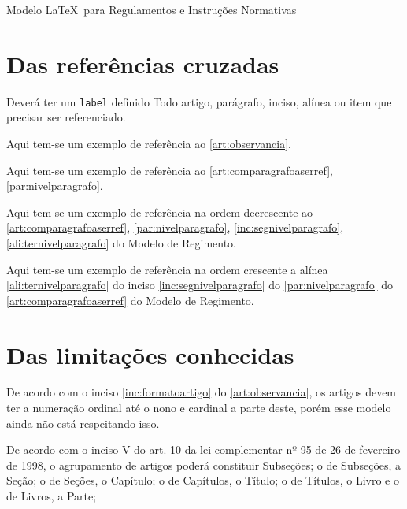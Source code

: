 \documentclass[11pt,twoside,a4paper]{inifsc}
\begin{document}
\begin{normativa}{Modelo \LaTeX~para Regulamentos e Instruções Normativas}
\section{Das referências cruzadas}

\begin{artigo}
    \item Deverá ter um \texttt{label} definido Todo artigo, parágrafo, inciso, alínea ou item que precisar ser referenciado.
    \begin{paragrafo}
        \item Aqui tem-se um exemplo de referência ao \ref{art:observancia}.
        \item Aqui tem-se um exemplo de referência ao \ref{art:comparagrafoaserref}, \ref{par:nivelparagrafo}.
        \item Aqui tem-se um exemplo de referência na ordem decrescente ao \ref{art:comparagrafoaserref}, \ref{par:nivelparagrafo}, \ref{inc:segnivelparagrafo}, \ref{ali:ternivelparagrafo} do Modelo de Regimento.
        \item Aqui tem-se um exemplo de referência na ordem crescente a alínea \ref{ali:ternivelparagrafo} do inciso \ref{inc:segnivelparagrafo} do \ref{par:nivelparagrafo} do \ref{art:comparagrafoaserref} do Modelo de Regimento.
    \end{paragrafo}
\end{artigo}


\section{Das limitações conhecidas}

\begin{artigo}
    \item De acordo com o inciso \ref{inc:formatoartigo} do \ref{art:observancia}, os artigos devem ter a numeração ordinal até o nono e cardinal a parte deste, porém esse modelo ainda não está respeitando isso.
    \item De acordo com o inciso V do art. 10 da lei complementar nº 95 de 26 de fevereiro de 1998, o agrupamento de artigos poderá constituir Subseções; o de Subseções, a Seção; o de Seções, o Capítulo; o de Capítulos, o Título; o de Títulos, o Livro e o de Livros, a Parte;
    
\end{artigo}

    
\end{normativa}
\end{document}
